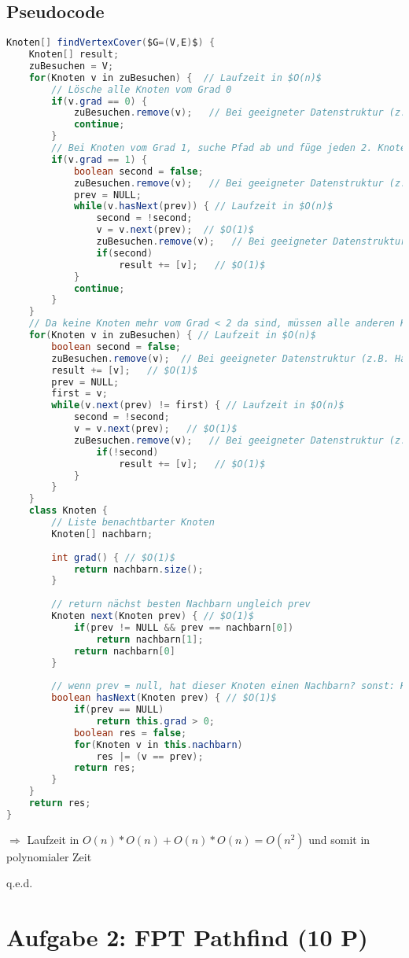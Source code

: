 \documentclass[a4paper,11pt,twoside]{scrartcl}
\newcommand{\qed}{%
	\begin{flushright}
		q.e.d.
	\end{flushright}%
	}
\begin{document}
\subsection{Pseudocode}
\begin{lstlisting}[language=Java]
Knoten[] findVertexCover($G=(V,E)$) {
	Knoten[] result;
	zuBesuchen = V;
	for(Knoten v in zuBesuchen) {  // Laufzeit in $O(n)$
		// Lösche alle Knoten vom Grad 0
		if(v.grad == 0) {
			zuBesuchen.remove(v);   // Bei geeigneter Datenstruktur (z.B. Hashing) $O(1)$
			continue;
		}
		// Bei Knoten vom Grad 1, suche Pfad ab und füge jeden 2. Knoten dem Ergebniss hinzu
		if(v.grad == 1) {
			boolean second = false;
			zuBesuchen.remove(v);   // Bei geeigneter Datenstruktur (z.B. Hashing) $O(1)$
			prev = NULL;
			while(v.hasNext(prev)) { // Laufzeit in $O(n)$
				second = !second;
				v = v.next(prev);  // $O(1)$
				zuBesuchen.remove(v);   // Bei geeigneter Datenstruktur (z.B. Hashing) $O(1)$
				if(second)
					result += [v];   // $O(1)$
			}
			continue;
		}
	} 
	// Da keine Knoten mehr vom Grad < 2 da sind, müssen alle anderen Knoten Zykel bilden
	for(Knoten v in zuBesuchen) { // Laufzeit in $O(n)$
		boolean second = false;
		zuBesuchen.remove(v);  // Bei geeigneter Datenstruktur (z.B. Hashing) $O(1)$
		result += [v];   // $O(1)$
		prev = NULL;
		first = v;
		while(v.next(prev) != first) { // Laufzeit in $O(n)$
			second = !second;
			v = v.next(prev);   // $O(1)$
			zuBesuchen.remove(v);   // Bei geeigneter Datenstruktur (z.B. Hashing) $O(1)$
				if(!second)
					result += [v];   // $O(1)$
			}
		}
	}
	class Knoten {
		// Liste benachtbarter Knoten
		Knoten[] nachbarn;
		
		int grad() { // $O(1)$
			return nachbarn.size();
		}
		
		// return nächst besten Nachbarn ungleich prev
		Knoten next(Knoten prev) { // $O(1)$
			if(prev != NULL && prev == nachbarn[0])
				return nachbarn[1];
			return nachbarn[0]
		}
		
		// wenn prev = null, hat dieser Knoten einen Nachbarn? sonst: Hat dieser Knoten einen Nachbarn ungleich prev?
		boolean hasNext(Knoten prev) { // $O(1)$
			if(prev == NULL)
				return this.grad > 0;
			boolean res = false;
			for(Knoten v in this.nachbarn)
				res |= (v == prev);
			return res;
		}
	}
	return res;
}
\end{lstlisting}
$\Rightarrow$ Laufzeit in $O(n) * O(n) + O(n) * O(n) = O(n^2)$ und somit in polynomialer Zeit
\qed
\section{Aufgabe 2: FPT Pathfind (10 P)}
\end{document}
